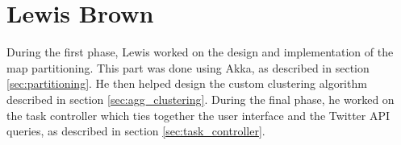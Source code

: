 \section{Lewis Brown}

During the first phase, Lewis worked on the design and implementation of the
map partitioning.  This part was done using Akka, as described in section
\ref{sec:partitioning}.  He then helped design the custom clustering algorithm
described in section \ref{sec:agg_clustering}.  During the final phase, he
worked on the task controller which ties together the user interface and the
Twitter API queries, as described in section \ref{sec:task_controller}.
